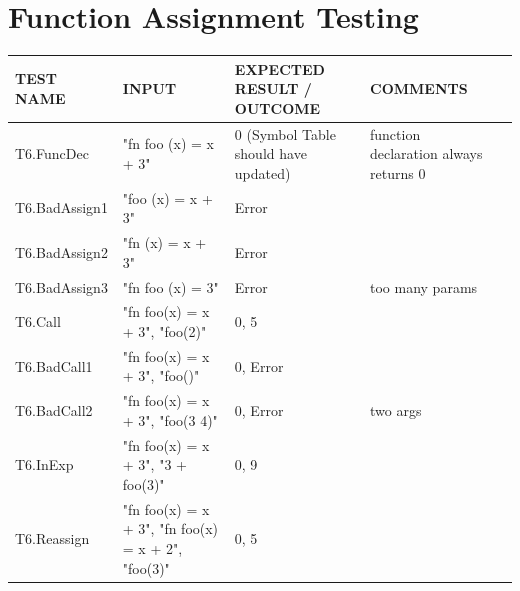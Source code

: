 \documentclass[a4paper, oneside, 11pt]{report}
\begin{document}
    \section{Function Assignment Testing}
    \label{FuncAssignTest}
    \begin{tabular}{|p{1.5in}|p{1.5in}|p{1.6in}|p{1.6in}|p{2.4in}|}
        \hline
        TEST NAME       & INPUT                     & EXPECTED RESULT / OUTCOME              & COMMENTS                                \\
        \hline
        \hline
        T6.FuncDec     & "fn foo (x) = x + 3"                           & 0 (Symbol Table should have updated)     & function declaration always returns 0  \\
        \hline
        T6.BadAssign1  & "foo (x) = x + 3"                              & Error                                    &                                        \\
        \hline
        T6.BadAssign2  & "fn (x) = x + 3"                               & Error                                    &                                        \\
        \hline
        T6.BadAssign3  & "fn foo (x) = 3"                               & Error                                    & too many params                        \\
        \hline
        T6.Call        & "fn foo(x) = x + 3", "foo(2)"                    & 0, 5                                     &                                        \\
        \hline
        T6.BadCall1    & "fn foo(x) = x + 3", "foo()"                     & 0, Error                                 &                                        \\
        \hline
        T6.BadCall2    & "fn foo(x) = x + 3", "foo(3 4)"                  & 0, Error                                 & two args                               \\
        \hline
        T6.InExp       & "fn foo(x) = x + 3", "3 + foo(3)"                & 0, 9                                     &                                        \\
        \hline
        T6.Reassign    & "fn foo(x) = x + 3", "fn foo(x) = x + 2", "foo(3)" & 0, 5                                     &                                        \\
        \hline
    \end{tabular}
\end{document}
